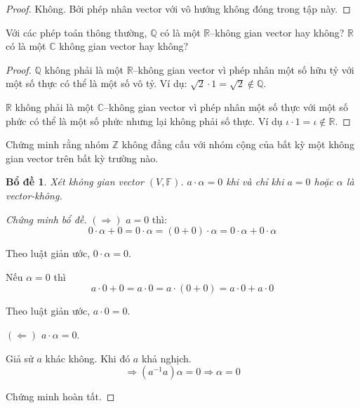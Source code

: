 \documentclass[class=linearalgebra,crop=false]{standalone}
\newtheorem{lemma}{Bổ đề}
\begin{document}
\begin{proof}Không. Bởi phép nhân vector với vô hướng không đóng trong tập này.
\end{proof}

\begin{exercise}Với các phép toán thông thường, $\mathbb{Q}$ có là một $\mathbb{R}$--không gian vector hay không? $\mathbb{R}$ có là một $\mathbb{C}$ không gian vector hay không?
\end{exercise}

\begin{proof}$\mathbb{Q}$ không phải là một $\mathbb{R}$--không gian vector vì phép nhân một số hữu tỷ với một số thực có thể là một số vô tỷ. Ví dụ: $\sqrt{2}\cdot 1 = \sqrt{2}\not\in\mathbb{Q}$.
    \par $\mathbb{R}$ không phải là một $\mathbb{C}$--không gian vector vì phép nhân một số thực với một số phức có thể là một số phức nhưng lại không phải số thực. Ví dụ $\iota\cdot 1 = \iota\not\in\mathbb{R}$.
\end{proof}

\begin{exercise}Chứng minh rằng nhóm $\mathbb{Z}$ không đẳng cấu với nhóm cộng của bất kỳ một không gian vector trên bất kỳ trường nào.
\end{exercise}

\begin{lemma}Xét không gian vector $(V, \mathbb{F})$. $a\cdot\alpha = 0$ khi và chỉ khi $a = 0$ hoặc $\alpha$ là vector-không.
\end{lemma}

\begin{proof}[Chứng minh bổ đề]$(\Rightarrow)$ $a = 0$ thì:
    \[ 0\cdot\alpha + 0 = 0\cdot\alpha = (0 + 0)\cdot\alpha = 0\cdot\alpha + 0\cdot\alpha \]
    \par Theo luật giản ước, $0\cdot\alpha = 0$.
    \par Nếu $\alpha = 0$ thì
    \[ a\cdot 0 + 0 = a\cdot 0 = a\cdot (0 + 0) = a\cdot 0 + a\cdot 0 \]
    \par Theo luật giản ước, $a\cdot 0 = 0$.
    \bigskip
    \par $(\Leftarrow)$ $a\cdot\alpha = 0$.
    \par Giả sử $a$ khác không. Khi đó $a$ khả nghịch.
    \[ \Rightarrow (a^{-1}a)\alpha = 0 \Rightarrow \alpha = 0\]
    \par Chứng minh hoàn tất.
\end{proof}
\end{document}
